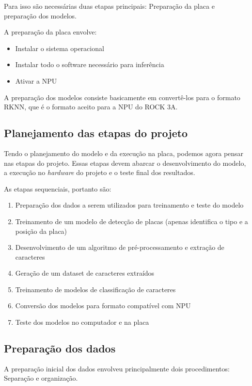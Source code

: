 Para isso são necessárias duas etapas principais: Preparação da placa e preparação dos modelos.

A preparação da placa envolve:

\begin{itemize}
	\item Instalar o sistema operacional
	\item Instalar todo o software necessário para inferência
	\item Ativar a NPU
\end{itemize}

A preparação dos modelos consiste basicamente em convertê-los para o formato RKNN, que é o formato aceito para a NPU do ROCK 3A.

\subsection{Planejamento das etapas do projeto}

Tendo o planejamento do modelo e da execução na placa, podemos agora pensar nas etapas do projeto. Essas etapas devem abarcar o desenvolvimento do modelo, a execução no \textit{hardware} do projeto e o teste final dos resultados.

As etapas sequenciais, portanto são:

\begin{enumerate}
	\item Preparação dos dados a serem utilizados para treinamento e teste do modelo
	\item Treinamento de um modelo de detecção de placas (apenas identifica o tipo e a posição da placa)
	\item Desenvolvimento de um algoritmo de pré-processamento e extração de caracteres
	\item Geração de um dataset de caracteres extraídos
	\item Treinamento de modelos de classificação de caracteres
	\item Conversão dos modelos para formato compatível com NPU
	\item Teste dos modelos no computador e na placa
\end{enumerate}

\subsection{Preparação dos dados}

A preparação inicial dos dados envolveu principalmente dois procedimentos: Separação e organização. 

